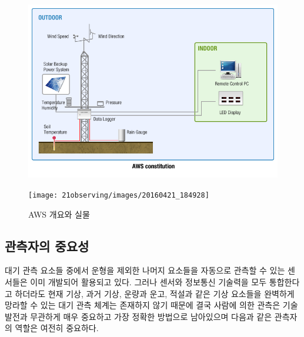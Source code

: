 \begin{figure}[h]
	\centering
	\begin{minipage}{.65\textwidth}
		\centering	
		\includegraphics[width=0.95\linewidth]{21observing/images/aws1}
	\end{minipage}
	\begin{minipage}{.33\textwidth}
		\centering
		\texttt{[image: 21observing/images/20160421\_184928]}
	\end{minipage}
	\caption{AWS 개요와 실물}
	\label{fig:aws}
\end{figure}


\subsection{관측자의 중요성}

대기 관측 요소들 중에서 운형을 제외한 나머지 요소들을 자동으로 관측할 수 있는 센서들은 이미 개발되어 활용되고 있다. 그러나 센서와 정보통신 기술력을 모두 통합한다고 하더라도 현재 기상, 과거 기상, 운량과 운고, 적설과 같은 기상 요소들을 완벽하게 망라할 수 있는 대기 관측 체계는 존재하지 않기 때문에 결국 사람에 의한 관측은 기술 발전과 무관하게 매우 중요하고 가장 정확한 방법으로 남아있으며 다음과 같은 관측자의 역할은 여전히 중요하다.

